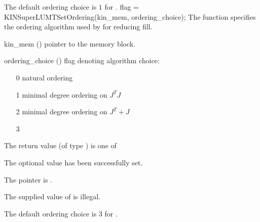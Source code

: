 {
  The default ordering choice is $1$ for .
}
{
  flag = KINSuperLUMTSetOrdering(kin\_mem, ordering\_choice);
}
{
  The function  specifies the ordering algorithm
  used by {\kinsuperlumt} for reducing fill.
}
{
  \begin{args}
  \item[kin\_mem] ()
    pointer to the {\kinsol} memory block.
  \item[ordering\_choice] ()
    flag denoting algorithm choice:
    \begin{itemize}
    \item[0] natural ordering
    \item[1] minimal degree ordering on $J^TJ$
    \item[2] minimal degree ordering on $J^T + J$
    \item[3] 
    \end{itemize}
  \end{args}
}
{
  The return value  (of type ) is one of
  \begin{args}
  \item[\Id{KINSLS\_SUCCESS}] 
    The optional value has been successfully set.
  \item[\Id{KINSLS\_MEM\_NULL}]
    The  pointer is .
  \item[\Id{KINSLS\_ILL\_INPUT}]
    The supplied value of  is illegal.
  \end{args}
}
{
  The default ordering choice is $3$ for .
}

